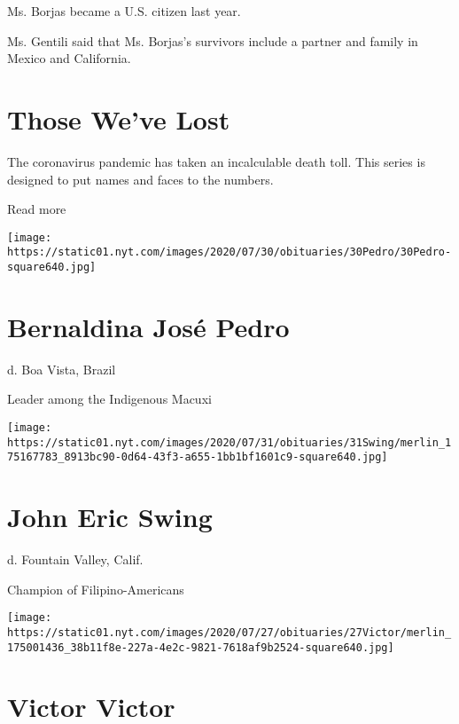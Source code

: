 Ms. Borjas became a U.S. citizen last year.

Ms. Gentili said that Ms. Borjas's survivors include a partner and
family in Mexico and California.

\href{https://www.nytimes.com/interactive/2020/obituaries/people-died-coronavirus-obituaries.html?action=click\&pgtype=Article\&state=default\&region=BELOW_MAIN_CONTENT\&context=covid_obits_promo}{}

\hypertarget{those-weve-lost}{%
\section{Those We've Lost}\label{those-weve-lost}}

The coronavirus pandemic has taken an incalculable death toll. This
series is designed to put names and faces to the numbers.

Read more

\texttt{[image: https://static01.nyt.com/images/2020/07/30/obituaries/30Pedro/30Pedro-square640.jpg]}

\hypertarget{bernaldina-josuxe9-pedro}{%
\section{Bernaldina José Pedro}\label{bernaldina-josuxe9-pedro}}

d. Boa Vista, Brazil

Leader among the Indigenous Macuxi

\texttt{[image: https://static01.nyt.com/images/2020/07/31/obituaries/31Swing/merlin\_175167783\_8913bc90-0d64-43f3-a655-1bb1bf1601c9-square640.jpg]}

\hypertarget{john-eric-swing}{%
\section{John Eric Swing}\label{john-eric-swing}}

d. Fountain Valley, Calif.

Champion of Filipino-Americans

\texttt{[image: https://static01.nyt.com/images/2020/07/27/obituaries/27Victor/merlin\_175001436\_38b11f8e-227a-4e2c-9821-7618af9b2524-square640.jpg]}

\hypertarget{victor-victor}{%
\section{Victor Victor}\label{victor-victor}}

